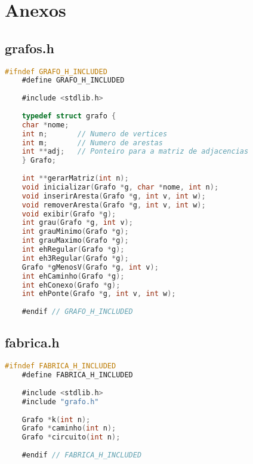 \documentclass[12pt,a4paper,oneside]{article}
\begin{document}
	\newpage
	\section*{Anexos}
	\subsection*{grafos.h}
	
	\begin{lstlisting}[language=C]
	#ifndef GRAFO_H_INCLUDED
	#define GRAFO_H_INCLUDED
	
	#include <stdlib.h>
	
	typedef struct grafo {
	char *nome;
	int n;       // Numero de vertices
	int m;       // Numero de arestas
	int **adj;   // Ponteiro para a matriz de adjacencias
	} Grafo;
	
	int **gerarMatriz(int n);
	void inicializar(Grafo *g, char *nome, int n);
	void inserirAresta(Grafo *g, int v, int w);
	void removerAresta(Grafo *g, int v, int w);
	void exibir(Grafo *g);
	int grau(Grafo *g, int v);
	int grauMinimo(Grafo *g);
	int grauMaximo(Grafo *g);
	int ehRegular(Grafo *g);
	int eh3Regular(Grafo *g);
	Grafo *gMenosV(Grafo *g, int v);
	int ehCaminho(Grafo *g);
	int ehConexo(Grafo *g);
	int ehPonte(Grafo *g, int v, int w);
	
	#endif // GRAFO_H_INCLUDED\end{lstlisting}
	
	\newpage
	
	\subsection*{fabrica.h}
	
	\begin{lstlisting}[language=C]
	#ifndef FABRICA_H_INCLUDED
	#define FABRICA_H_INCLUDED
	
	#include <stdlib.h>
	#include "grafo.h"
	
	Grafo *k(int n);
	Grafo *caminho(int n);
	Grafo *circuito(int n);
	
	#endif // FABRICA_H_INCLUDED\end{lstlisting}
	
\end{document}

